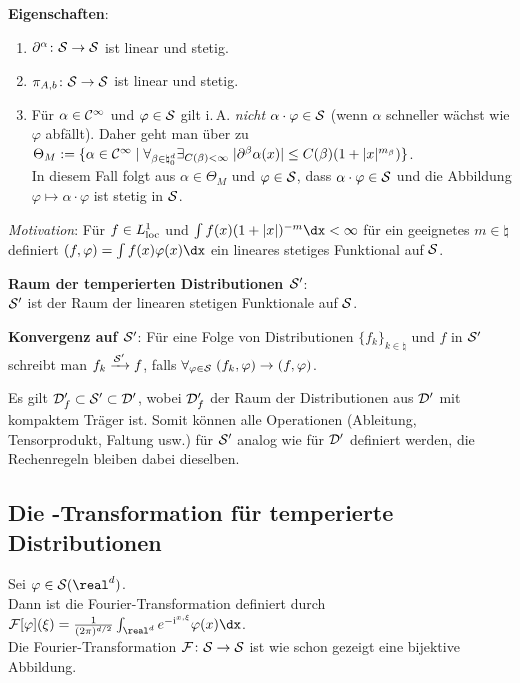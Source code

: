 \textbf{Eigenschaften}:
\begin{enumerate}
    \item
    $\partial^\alpha\colon \S \rightarrow \S$ ist linear und stetig.
    
    \item
    $\pi_{A,b}\colon \S \rightarrow \S$ ist linear und stetig.
    
    \item
    Für $\alpha \in \C^\infty$ und $\varphi \in \S$ gilt i.\,A. \emph{nicht}
    $\alpha \cdot \varphi \in \S$
    (wenn $\alpha$ schneller wächst wie $\varphi$ abfällt).
    Daher geht man über zu $\Theta_M := \{\alpha \in \C^\infty \;|\;
    \forall_{\beta \in \natural_0^d} \exists_{C(\beta) < \infty}\;
    |\partial^\beta \alpha(x)| \le C(\beta) (1 + |x|^{m_\beta})\}$.\\
    In diesem Fall folgt aus $\alpha \in \Theta_M$ und $\varphi \in \S$,
    dass $\alpha \cdot \varphi \in \S$ und die Abbildung
    $\varphi \mapsto \alpha \cdot \varphi$ ist stetig in $\S$.
\end{enumerate}

\linie

\emph{Motivation}:
Für $f \in L^1_\loc$ und $\int f(x) (1 + |x|)^{-m} \dx < \infty$ für ein
geeignetes $m \in \natural$ definiert
$(f, \varphi) = \int f(x) \varphi(x)\dx$ ein lineares stetiges Funktional auf
$\S$.

\textbf{Raum der temperierten Distributionen $\S'$}:\\
$\S'$ ist der Raum der linearen stetigen Funktionale auf $\S$.

\textbf{Konvergenz auf $\S'$}:
Für eine Folge von Distributionen $\{f_k\}_{k \in \natural}$ und
$f$ in $\S'$ schreibt man $f_k \xrightarrow{\S'} f$, falls
$\forall_{\varphi \in \S}\; (f_k, \varphi) \to (f, \varphi)$.

Es gilt $\D_f' \subset \S' \subset \D'$, wobei
$\D_f'$ der Raum der Distributionen aus $\D'$ mit kompaktem Träger ist.
Somit können alle Operationen
(Ableitung, Tensorprodukt, Faltung usw.)
für $\S'$ analog wie für $\D'$ definiert werden,
die Rechenregeln bleiben dabei dieselben.

\pagebreak

\subsection{%
    Die -Transformation für temperierte Distributionen%
}

Sei $\varphi \in \S(\real^d)$.\\
Dann ist die Fourier-Transformation definiert durch
$\F[\varphi](\xi) = \frac{1}{(2\pi)^{d/2}}
\int_{\real^d} e^{-\i\sp{x, \xi}}\varphi(x)\dx$.\\
Die Fourier-Transformation $\F\colon \S \rightarrow \S$ ist wie schon gezeigt
eine bijektive Abbildung.


